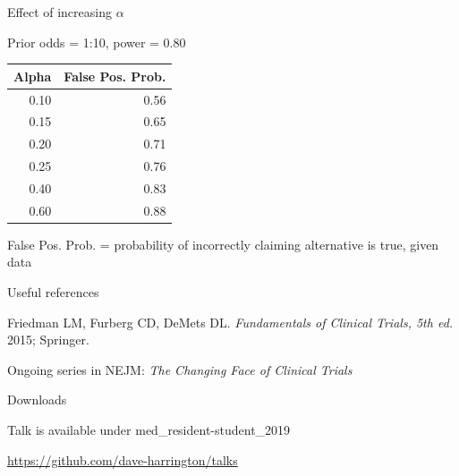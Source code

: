 \documentclass[ignorenonframetext,]{beamer}
\begin{document}
\begin{frame}{%
\protect\hypertarget{effect-of-increasing-alpha}{%
Effect of increasing \(\alpha\)}}

Prior odds = 1:10, power = 0.80

\begin{longtable}[]{@{}rr@{}}
\toprule
Alpha & False Pos. Prob.\tabularnewline
\midrule
\endhead
0.10 & 0.56\tabularnewline
0.15 & 0.65\tabularnewline
0.20 & 0.71\tabularnewline
0.25 & 0.76\tabularnewline
0.40 & 0.83\tabularnewline
0.60 & 0.88\tabularnewline
\bottomrule
\end{longtable}

False Pos. Prob. = probability of incorrectly claiming alternative is
true, given data

\end{frame}

\begin{frame}{%
\protect\hypertarget{useful-references}{%
Useful references}}

Friedman LM, Furberg CD, DeMets DL.
\textit{Fundamentals of Clinical Trials,  5th ed.} 2015; Springer.

Ongoing series in NEJM: \textit{The Changing Face of Clinical Trials}

\end{frame}

\begin{frame}{%
\protect\hypertarget{downloads}{%
Downloads}}

Talk is available under med\_resident-student\_2019

\url{https://github.com/dave-harrington/talks}

\end{frame}
\end{document}
